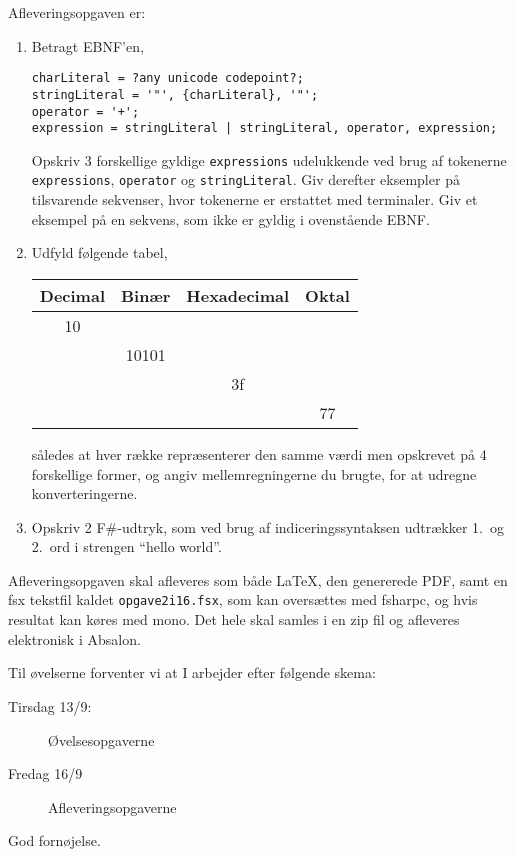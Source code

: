 \documentclass[a4paper,12pt]{article}
\begin{document}
Afleveringsopgaven er:
\begin{enumerate}[label=2i.\arabic*,start=0]
\item Betragt EBNF'en,
\begin{lstlisting}[language=ebnf]
charLiteral = ?any unicode codepoint?;
stringLiteral = '"', {charLiteral}, '"';
operator = '+';
expression = stringLiteral | stringLiteral, operator, expression;
\end{lstlisting}
Opskriv 3 forskellige gyldige \lstinline[language=ebnf]{expressions} udelukkende ved brug af tokenerne \lstinline[language=ebnf]{expressions},  \lstinline[language=ebnf]{operator} og \lstinline[language=ebnf]{stringLiteral}. Giv derefter eksempler på tilsvarende sekvenser, hvor tokenerne er erstattet med terminaler. Giv et eksempel på en sekvens, som ikke er gyldig i ovenstående EBNF.
\item Udfyld følgende tabel,
  \begin{center}
    \begin{tabular}{|c|c|c|c|}
      \hline
      Decimal & Binær & Hexadecimal & Oktal\\
      \hline
              10 &  &  & \\
      \hline
              & 10101 &  & \\
      \hline
               &  & 3f  & \\
      \hline
              &  &  & 77 \\
      \hline
    \end{tabular}
  \end{center}
således at hver række repræsenterer den samme værdi men opskrevet på 4 forskellige former, og angiv mellemregningerne du brugte, for at udregne konverteringerne.
\item Opskriv 2 F\#-udtryk, som ved brug af indiceringssyntaksen udtrækker 1.\ og 2.\ ord i strengen "`hello world"'.
\end{enumerate}
Afleveringsopgaven skal afleveres som både LaTeX, den genererede PDF,
samt en fsx tekstfil kaldet \verb|opgave2i16.fsx|, som kan oversættes med fsharpc, og hvis resultat kan køres med mono. Det hele skal samles i en zip fil og afleveres elektronisk i Absalon.

Til øvelserne forventer vi at I arbejder efter følgende skema:
\begin{description}
\item[Tirsdag 13/9:] Øvelsesopgaverne
\item[Fredag 16/9]  Afleveringsopgaverne
\end{description}


\flushright God fornøjelse.
\end{document}
